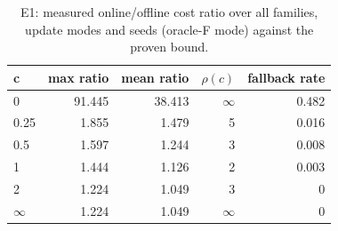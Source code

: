 \begin{table}[t]
\centering
\caption{E1: measured online/offline cost ratio over all families, update modes and seeds (oracle-F mode) against the proven bound.}
\label{tab:e1}
\small
\begin{tabular}{lrrrr}
\hline
c & max ratio & mean ratio & $\rho(c)$ & fallback rate \\
\hline
0 & 91.445 & 38.413 & $\infty$ & 0.482 \\
0.25 & 1.855 & 1.479 & 5 & 0.016 \\
0.5 & 1.597 & 1.244 & 3 & 0.008 \\
1 & 1.444 & 1.126 & 2 & 0.003 \\
2 & 1.224 & 1.049 & 3 & 0 \\
$\infty$ & 1.224 & 1.049 & $\infty$ & 0 \\
\hline
\end{tabular}
\end{table}
